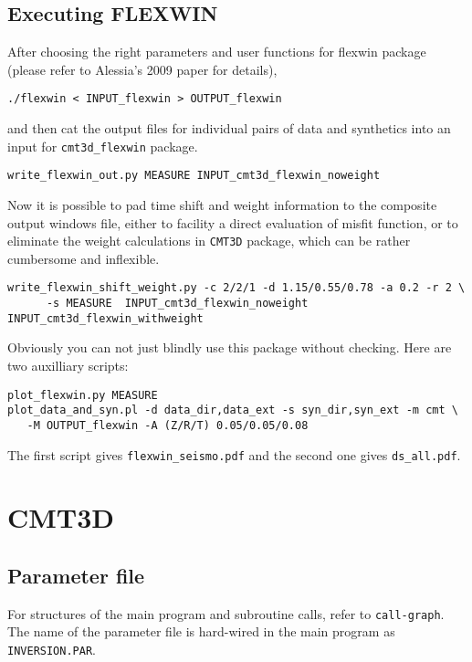 \documentclass[12pt,titlepage,fleqn]{article}
\begin{document}
\subsection{Executing FLEXWIN}
After choosing the right parameters and user functions for flexwin package (please refer to Alessia's 2009 paper for details), 
\begin{verbatim}
./flexwin < INPUT_flexwin > OUTPUT_flexwin
\end{verbatim}
and then cat the output files for individual pairs of data and synthetics into an input for \verb=cmt3d_flexwin= package.
\begin{verbatim}
write_flexwin_out.py MEASURE INPUT_cmt3d_flexwin_noweight
\end{verbatim}
Now it is possible to pad time shift and weight information to the composite output windows file, either to facility a direct evaluation of misfit function, or to eliminate the weight calculations in \verb+CMT3D+ package, which can be rather cumbersome and inflexible.
\begin{verbatim}
write_flexwin_shift_weight.py -c 2/2/1 -d 1.15/0.55/0.78 -a 0.2 -r 2 \
      -s MEASURE  INPUT_cmt3d_flexwin_noweight INPUT_cmt3d_flexwin_withweight
\end{verbatim}
Obviously you can not just blindly use this package without checking. Here are two auxilliary scripts:
\begin{verbatim}
plot_flexwin.py MEASURE 
plot_data_and_syn.pl -d data_dir,data_ext -s syn_dir,syn_ext -m cmt \
   -M OUTPUT_flexwin -A (Z/R/T) 0.05/0.05/0.08 
\end{verbatim}
The first script gives \verb+flexwin_seismo.pdf+ and the second one gives \verb+ds_all.pdf+.
\section{CMT3D}
\subsection{Parameter file}
For structures of the main program and subroutine calls, refer to \verb=call-graph=. The name of the parameter file is hard-wired in the main program as \verb=INVERSION.PAR=.
\end{document}
